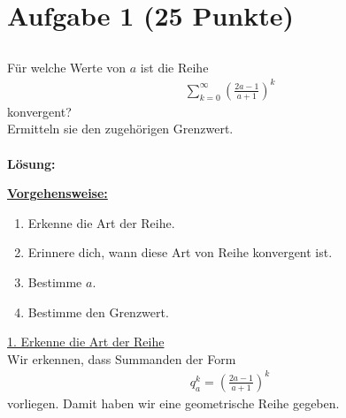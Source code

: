 \vspace{1cm}
\renewcommand{\labelenumi}{\theenumi.}

\section*{Aufgabe 1 (25 Punkte)}
\subsection*{}
Für welche Werte von $a$ ist die Reihe 
\begin{align*}
\sum \limits_{k=0}^\infty \left( \frac{2 a -1}{a+1} \right)^k
\end{align*}
konvergent?\\
Ermitteln sie den zugehörigen Grenzwert.
\\
\\
\textbf{Lösung:}
\begin{mdframed}
\underline{\textbf{Vorgehensweise:}}
\begin{enumerate}
\item Erkenne die Art der Reihe.
\item Erinnere dich, wann diese Art von Reihe konvergent ist.
\item Bestimme $a$.
\item Bestimme den Grenzwert.
\end{enumerate}
\end{mdframed}

\underline{1. Erkenne die Art der Reihe}\\
Wir erkennen, dass Summanden der Form
\begin{align*}
q_a^k = \left( \frac{2 a -1}{a+1} \right)^k
\end{align*}
vorliegen. Damit haben wir eine geometrische Reihe gegeben.\\
\\


